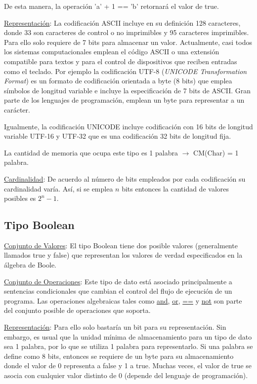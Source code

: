 De esta manera, la operación 'a' + 1 == 'b' retornará el valor de true.

\underline{Representación}: La codificación ASCII incluye en su definición 128 caracteres, donde 33 son caracteres de control o no imprimibles y 95 caracteres imprimibles. Para ello solo requiere de 7 bits para almacenar un valor. Actualmente, casi todos los sistemas computacionales emplean el código ASCII o una extensión compatible para textos y para el control de dispositivos que reciben entradas como el teclado. Por ejemplo la codificación UTF-8 (\textit{UNICODE Transformation Format}) es un formato de codificación orientada a byte (8 bits) que emplea símbolos de longitud variable e incluye la especificación de 7 bits de ASCII. Gran parte de los lenguajes de programación, emplean un byte para representar a un carácter.

Igualmente, la codificación UNICODE incluye codificación con 16 bits de longitud variable UTF-16 y UTF-32 que es una codificación 32 bits de longitud fija.

La cantidad de memoria que ocupa este tipo es 1 palabra $\rightarrow$ CM(Char) = 1 palabra.

\underline{Cardinalidad}: De acuerdo al número de bits empleados por cada codificación su cardinalidad varía. Así, si se emplea $n$ bits entonces la cantidad de valores posibles es $2^n - 1$.

\subsection{Tipo Boolean}

\underline{Conjunto de Valores}: El tipo Boolean tiene dos posible valores (generalmente llamados true y false) que representan los valores de verdad especificados en la álgebra de Boole.

\underline{Conjunto de Operaciones}: Este tipo de dato está asociado principalmente a sentencias condicionales que cambian el control del flujo de ejecución de un programa. Las operaciones algebraicas tales como \underline{and}, \underline{or}, \underline{==} y \underline{not} son parte del conjunto posible de operaciones que soporta.

\underline{Representación}: Para ello solo bastaría un bit para su representación. Sin embargo, es usual que la unidad mínima de almacenamiento para un tipo de dato sea 1 palabra, por lo que se utiliza 1 palabra para representarlo. Si una palabra se define como 8 bits, entonces se requiere de un byte para su almacenamiento donde el valor de 0 representa a false y 1 a true. Muchas veces, el valor de true se asocia con cualquier valor distinto de 0 (depende del lenguaje de programación).

